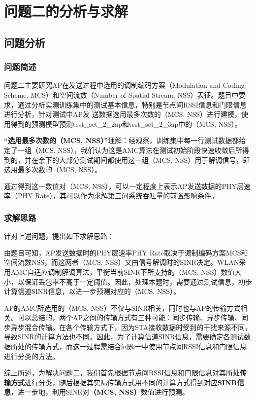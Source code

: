 \documentclass[bwprint]{gmcmthesis}
\begin{document}
\newpage
\section{问题二的分析与求解}
\subsection{问题分析}
\subsubsection{问题简述}
问题二主要研究AP在发送过程中选用的调制编码方案（Modulation and Coding Scheme, MCS）和空间流数（Number of Spatial Stream, NSS）表征。题目中要求，通过分析实测训练集中的测试基本信息，特别是节点间RSSI信息和门限信息进行分析，针对测试中AP发
送数据选用最多次数的（MCS, NSS）进行建模，使用得到的预测模型预测test\_set\_2\_2ap和test\_set\_2\_3ap中的（MCS, NSS）。

\textbf{“选用最多次数的（MCS, NSS）”}理解：经观察，训练集中每一行测试数据都给定了一组（MCS, NSS），我们认为这是AMC算法在测试初始阶段快速收敛后所得到的，并在余下的大部分测试期间都使用这一组（MCS, NSS）用于解调信号，即选用最多次数的（MCS, NSS）。

通过得到这一数值对（MCS, NSS），可以一定程度上表示AP发送数据的PHY层速率（PHY Rate），其可以作为求解第三问系统吞吐量的前置影响条件。

\subsubsection{求解思路}
针对上述问题，提出如下求解思路：

由题目可知，AP发送数据时的PHY层速率PHY Rate取决于调制编码方案MCS和空间流数NSS，而这两者（MCS, NSS）又由信号解调时的SINR决定。WLAN采用AMC自适应调制解调算法，平衡当前SINR下所支持的（MCS, NSS）数值大小，以保证丢包率不高于一定阈值。因此，处理本题时，需要通过测试信息，初步计算信道SINR信息，以进一步预测对应的（MCS, NSS）。

AP的AMC所选用的（MCS, NSS）不仅与SINR相关，同时也与AP的传输方式相关。可以总结的，两个AP之间的传输方式有三种可能：同步传输、异步传输、同步异步混合传输。在各个传输方式下，因为STA接收数据时受到的干扰来源不同，导致SINR的计算方法也不同。因此，为了计算信道SINR信息，需要确定各测试数据所处的传输方式，而这一过程需结合问题一中使用节点间RSSI信息和门限信息进行分类的方法。

综上所述，为解决问题二，我们首先根据节点间RSSI信息和门限信息对其所处\textbf{传输方式}进行分类，随后根据其实际传输方式用不同的计算方式得到对应\textbf{SINR信息}，进一步地，利用SINR对\textbf{（MCS, NSS）}数值进行预测。
\end{document}
